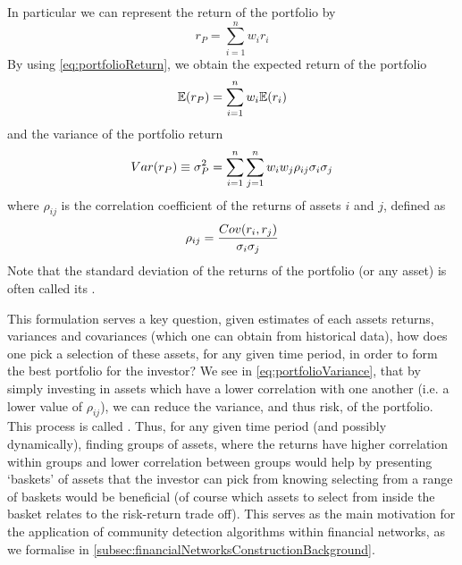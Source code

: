 In particular we can represent the return of the portfolio by
\begin{equation}
	\label{eq:portfolioReturn}
	r_{P} = \sum_{i=1}^{n} w_{i} r_{i}
\end{equation}
By using \cref{eq:portfolioReturn}, we obtain the expected return of the portfolio
\begin{equation}
	\label{eq:portfolioExpectedReturn}
	\mathbb{E}(r_{P}) = \sum_{i=1}^{n} w_{i} \mathbb{E}(r_{i})
\end{equation}
and the variance of the portfolio return
\begin{equation}
	\label{eq:portfolioVariance}
	Var(r_{P}) \equiv \sigma^{2}_{P}  = \sum_{i=1}^{n} \sum_{j=1}^{n} w_{i} w_{j} \rho_{ij} \sigma_{i} \sigma_{j}
\end{equation}
where $\rho_{ij}$ is the correlation coefficient of the returns of assets $i$ and $j$, defined as
\begin{equation}
	\label{eq:correlationCoefficient}
	\rho_{ij} = \frac{\covariance{r_{i},r_{j}}}{\sigma_{i} \sigma_{j}}
\end{equation}
Note that the standard deviation of the returns of the portfolio (or any asset) is often called its .

This formulation serves a key question, given estimates of each assets returns, variances and covariances (which one can obtain from historical data), how does one pick a selection of these assets, for any given time period, in order to form the best portfolio for the investor?
We see in \cref{eq:portfolioVariance}, that by simply investing in assets which have a lower correlation with one another (i.e. a lower value of $\rho_{ij}$), we can reduce the variance, and thus risk, of the portfolio. This process is called .
Thus, for any given time period (and possibly dynamically), finding groups of assets, where the returns have higher correlation within groups and lower correlation between groups would help by presenting `baskets' of assets that the investor can pick from knowing selecting from a range of baskets would be beneficial (of course which assets to select from inside the basket relates to the risk-return trade off). This serves as the main motivation for the application of community detection algorithms within financial networks, as we formalise in \cref{subsec:financialNetworksConstructionBackground}.


